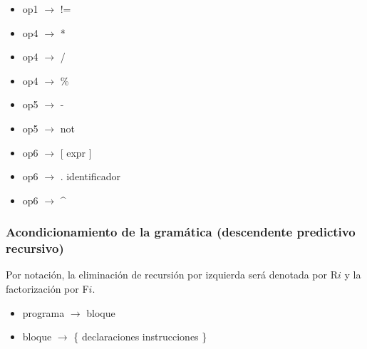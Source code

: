 \documentclass[11pt]{article}
\begin{document}
\begin{itemize}
            \item op1 $\rightarrow$ !=
            \item op4 $\rightarrow$ *
            \item op4 $\rightarrow$ /
            \item op4 $\rightarrow$ \%
            \item op5 $\rightarrow$ -
            \item op5 $\rightarrow$ not
            \item op6 $\rightarrow$ [ expr ]
            \item op6 $\rightarrow$ . identificador
            \item op6 $\rightarrow$ \^{}
        \end{itemize}
        \subsubsection{Acondicionamiento de la gramática (descendente predictivo recursivo)}
            Por notación, la eliminación de recursión por izquierda será denotada por R$i$ y la factorización por F$i$.  
        \begin{itemize}
            \item programa $\rightarrow$ bloque
            \item bloque $\rightarrow$ \{ declaraciones instrucciones \}
        \end{itemize}
        \
\end{document}
